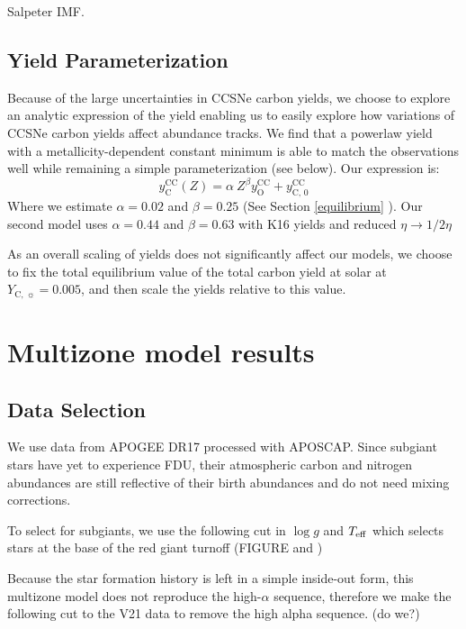 \documentclass[fleqn,usenatbib]{mnras}
\begin{document}
Salpeter IMF.

\subsection{Yield Parameterization}
  Because of the large uncertainties in CCSNe carbon yields, we choose to explore an analytic expression of the yield enabling us to easily explore how variations of CCSNe carbon yields affect abundance tracks. We find that a powerlaw yield with a metallicity-dependent constant minimum is able to match the observations well while remaining a simple parameterization (see below). Our expression is:
    \begin{equation}
   y_\text{C}^\text{CC}(Z) =  \alpha\ Z^\beta y_\text{O}^\text{CC} + y_\text{C, 0}^\text{CC}
    \end{equation}
   	Where we estimate $\alpha = 0.02$ and $\beta = 0.25$ (See Section \ref{equilibrium} ). Our second model uses $\alpha = 0.44$ and $\beta = 0.63$ with K16 yields and reduced $\eta \rightarrow 1/2 \eta$ 
    
    As an overall scaling of yields does not significantly affect our models, we choose to fix the total equilibrium value of the total carbon yield at solar at $Y_{\text{C},\ \sun} = 0.005$, and then scale the yields relative to this value. 

\section{Multizone model results}


\subsection{Data Selection}

We use data from APOGEE DR17 processed with APOSCAP. Since subgiant stars have yet to experience FDU, their atmospheric carbon and nitrogen abundances are still reflective of their birth abundances and do not need mixing corrections. 

To select for subgiants, we use the following cut in $\log g$ and $T_{\rm eff}$ which selects stars at the base of the red giant turnoff (FIGURE and \cite{jack_subgiant})


Because the star formation history is left in a simple inside-out form, this multizone model does not reproduce the high-$\alpha$ sequence, therefore we make the following cut to the V21 data to remove the high alpha sequence. (do we?) 
\end{document}
